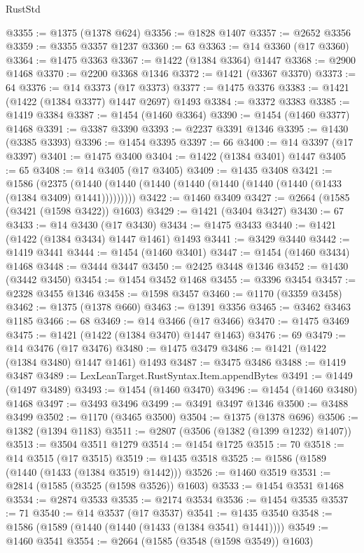 \begin{lexlean}{RustStd}
\begin{coremodule}
@3355 := @1375 (@1378 @624)
@3356 := @1828 @1407
@3357 := @2652 @3356
@3359 := @3355 @3357 @1237
@3360 := 63
@3363 := @14 @3360 (@17 @3360)
@3364 := @1475 @3363
@3367 := @1422 (@1384 @3364) @1447
@3368 := @2900 @1468
@3370 := @2200 @3368 @1346
@3372 := @1421 (@3367 @3370)
@3373 := 64
@3376 := @14 @3373 (@17 @3373)
@3377 := @1475 @3376
@3383 := @1421 (@1422 (@1384 @3377) @1447 @2697) @1493
@3384 := @3372 @3383
@3385 := @1419 @3384
@3387 := @1454 (@1460 @3364)
@3390 := @1454 (@1460 @3377) @1468
@3391 := @3387 @3390
@3393 := @2237 @3391 @1346
@3395 := @1430 (@3385 @3393)
@3396 := @1454 @3395
@3397 := 66
@3400 := @14 @3397 (@17 @3397)
@3401 := @1475 @3400
@3404 := @1422 (@1384 @3401) @1447
@3405 := 65
@3408 := @14 @3405 (@17 @3405)
@3409 := @1435 @3408
@3421 := @1586
    (@2375 (@1440 (@1440 (@1440 (@1440 (@1440 (@1440 (@1440 (@1433 (@1384 @3409) @1441)))))))))
@3422 := @1460 @3409
@3427 := @2664 (@1585 (@3421 (@1598 @3422)) @1603)
@3429 := @1421 (@3404 @3427)
@3430 := 67
@3433 := @14 @3430 (@17 @3430)
@3434 := @1475 @3433
@3440 := @1421 (@1422 (@1384 @3434) @1447 @1461) @1493
@3441 := @3429 @3440
@3442 := @1419 @3441
@3444 := @1454 (@1460 @3401)
@3447 := @1454 (@1460 @3434) @1468
@3448 := @3444 @3447
@3450 := @2425 @3448 @1346
@3452 := @1430 (@3442 @3450)
@3454 := @1454 @3452 @1468
@3455 := @3396 @3454
@3457 := @2328 @3455 @1346
@3458 := @1598 @3457
@3460 := @1170 (@3359 @3458)
@3462 := @1375 (@1378 @660)
@3463 := @1391 @3356
@3465 := @3462 @3463 @1185
@3466 := 68
@3469 := @14 @3466 (@17 @3466)
@3470 := @1475 @3469
@3475 := @1421 (@1422 (@1384 @3470) @1447 @1463)
@3476 := 69
@3479 := @14 @3476 (@17 @3476)
@3480 := @1475 @3479
@3486 := @1421 (@1422 (@1384 @3480) @1447 @1461) @1493
@3487 := @3475 @3486
@3488 := @1419 @3487
@3489 := LexLeanTarget.RustSyntax.Item.appendBytes
@3491 := @1449 (@1497 @3489)
@3493 := @1454 (@1460 @3470)
@3496 := @1454 (@1460 @3480) @1468
@3497 := @3493 @3496
@3499 := @3491 @3497 @1346
@3500 := @3488 @3499
@3502 := @1170 (@3465 @3500)
@3504 := @1375 (@1378 @696)
@3506 := @1382 (@1394 @1183)
@3511 := @2807 (@3506 (@1382 (@1399 @1232) @1407))
@3513 := @3504 @3511 @1279
@3514 := @1454 @1725
@3515 := 70
@3518 := @14 @3515 (@17 @3515)
@3519 := @1435 @3518
@3525 := @1586 (@1589 (@1440 (@1433 (@1384 @3519) @1442)))
@3526 := @1460 @3519
@3531 := @2814 (@1585 (@3525 (@1598 @3526)) @1603)
@3533 := @1454 @3531 @1468
@3534 := @2874 @3533
@3535 := @2174 @3534
@3536 := @1454 @3535
@3537 := 71
@3540 := @14 @3537 (@17 @3537)
@3541 := @1435 @3540
@3548 := @1586 (@1589 (@1440 (@1440 (@1433 (@1384 @3541) @1441))))
@3549 := @1460 @3541
@3554 := @2664 (@1585 (@3548 (@1598 @3549)) @1603)

\end{coremodule}
\end{lexlean}
